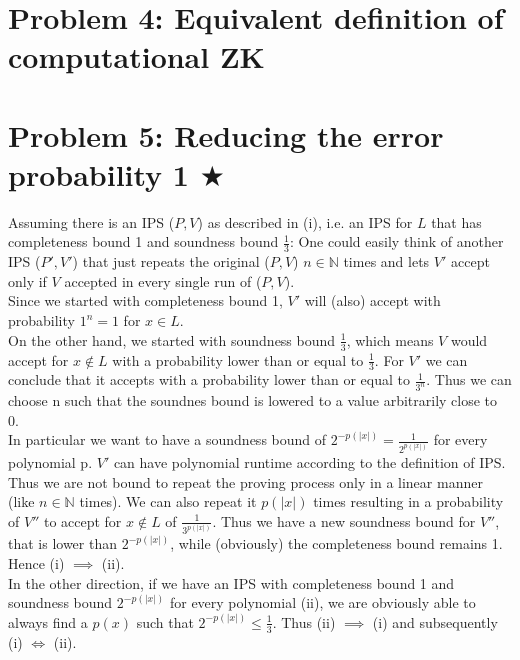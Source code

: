 \documentclass[12pt,pdftex,a4paper]{article}
\begin{document}
\section*{Problem 4: Equivalent definition of computational ZK}


\section*{Problem 5: Reducing the error probability 1 $\bigstar$}
Assuming there is an IPS ($P, V$) as described in (i), i.e. an IPS for $L$ that has completeness bound 1 and soundness bound $\frac{1}{3}$: One could easily think of another IPS ($P', V'$) that just repeats the original ($P, V$) $n\in \mathbb{N}$ times and lets $V'$ accept only if $V$ accepted in every single run of ($P, V$).\\
Since we started with completeness bound 1, $V'$ will (also) accept with probability $1^{n} = 1$ for $x\in L$.\\
On the other hand, we started with soundness bound $\frac{1}{3}$, which means $V$ would accept for $x\notin L$ with a probability lower than or equal to $\frac{1}{3}$. For $V'$ we can conclude that it accepts with a probability lower than or equal to $\frac{1}{3^n}$.
Thus we can choose n such that the soundnes bound is lowered to a value arbitrarily close to 0. %
\\
In particular we want to have a soundness bound of $2^{-p(|x|)} = \frac{1}{2^{p(|x|)}}$ for every polynomial p. $V'$ can have polynomial runtime according to the definition of IPS. Thus we are not bound to repeat the proving process only in a linear manner (like $n\in \mathbb{N}$ times). We can also repeat it $p(|x|)$ times resulting in a probability of $V''$ to accept for $x\notin L$ of $\frac{1}{3^{p(|x|)}}$. Thus we have a new soundness bound for $V''$, that is lower than $2^{-p(|x|)}$, while (obviously) the completeness bound remains 1. Hence (i) $\implies$ (ii).\\
In the other direction, if we have an IPS with completeness bound 1 and soundness bound $2^{-p(|x|)}$ for every polynomial (ii), we are obviously able to always find a $p(x)$ such that $2^{-p(|x|)} \leq \frac{1}{3}$. Thus (ii) $\implies$ (i) and subsequently (i) $\Leftrightarrow$ (ii).
\end{document}
